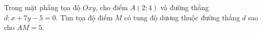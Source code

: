 \begin{bt}%
Trong mặt phẳng tọa độ $Oxy$, cho điểm $A(2;4)$ và đường thẳng $d\colon x+7y-5=0$. Tìm tọa độ điểm $M$ có tung độ dương thuộc đường thẳng $d$ sao cho $A M=5$.
\end{bt} 

